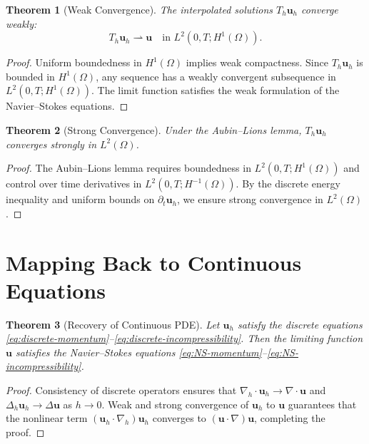 \documentclass[12pt]{article}
\newtheorem{theorem}{Theorem}
\begin{document}
\begin{theorem}[Weak Convergence]
The interpolated solutions $T_h \mathbf{u}_h$ converge weakly:
\begin{equation}
T_h \mathbf{u}_h \rightharpoonup \mathbf{u} \quad \text{in } L^2(0,T; H^1(\Omega)).
\end{equation}
\end{theorem}

\begin{proof}
Uniform boundedness in $H^1(\Omega)$ implies weak compactness. Since $T_h \mathbf{u}_h$ is bounded in $H^1(\Omega)$, any sequence has a weakly convergent subsequence in $L^2(0,T; H^1(\Omega))$. The limit function satisfies the weak formulation of the Navier--Stokes equations.
\end{proof}

\begin{theorem}[Strong Convergence]
Under the Aubin--Lions lemma, $T_h \mathbf{u}_h$ converges strongly in $L^2(\Omega)$.
\end{theorem}

\begin{proof}
The Aubin--Lions lemma requires boundedness in $L^2(0,T; H^1(\Omega))$ and control over time derivatives in $L^2(0,T; H^{-1}(\Omega))$. By the discrete energy inequality and uniform bounds on $\partial_t \mathbf{u}_h$, we ensure strong convergence in $L^2(\Omega)$.
\end{proof}

\section{Mapping Back to Continuous Equations}

\begin{theorem}[Recovery of Continuous PDE]
Let $\mathbf{u}_h$ satisfy the discrete equations \eqref{eq:discrete-momentum}--\eqref{eq:discrete-incompressibility}. Then the limiting function $\mathbf{u}$ satisfies the Navier--Stokes equations \eqref{eq:NS-momentum}--\eqref{eq:NS-incompressibility}.
\end{theorem}

\begin{proof}
Consistency of discrete operators ensures that $\nabla_h \cdot \mathbf{u}_h \to \nabla \cdot \mathbf{u}$ and $\Delta_h \mathbf{u}_h \to \Delta \mathbf{u}$ as $h \to 0$. Weak and strong convergence of $\mathbf{u}_h$ to $\mathbf{u}$ guarantees that the nonlinear term $(\mathbf{u}_h \cdot \nabla_h) \mathbf{u}_h$ converges to $(\mathbf{u} \cdot \nabla) \mathbf{u}$, completing the proof.
\end{proof}
\end{document}
